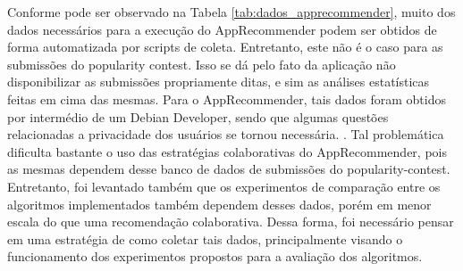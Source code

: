 \begin{table}[h]
\centering
{}
\caption{Dados necessários para execução do AppRecommender}
\label{tab:dados_apprecommender}
\end{table}

Conforme pode ser observado na Tabela \ref{tab:dados_apprecommender}, muito dos dados
necessários para a execução do AppRecommender podem ser obtidos de forma automatizada
por scripts de coleta. Entretanto, este não é o caso para as submissões do
popularity contest. Isso se dá pelo fato da aplicação não disponibilizar as submissões
propriamente ditas, e sim as análises estatísticas feitas em cima das mesmas. Para o
AppRecommender, tais dados foram obtidos por intermédio de um Debian Developer, sendo
que algumas questões relacionadas a privacidade dos usuários se tornou necessária.
\cite{araujo2011apprecommender}. Tal problemática dificulta bastante o uso das
estratégias colaborativas do AppRecommender, pois as mesmas dependem desse banco de dados
de submissões do popularity-contest. Entretanto, foi levantado também que os
experimentos de comparação entre os algoritmos implementados também dependem
desses dados, porém em menor escala do que uma recomendação colaborativa.
Dessa forma, foi necessário pensar em uma estratégia
de como coletar tais dados, principalmente visando o funcionamento dos experimentos propostos
para a avaliação dos algoritmos.

